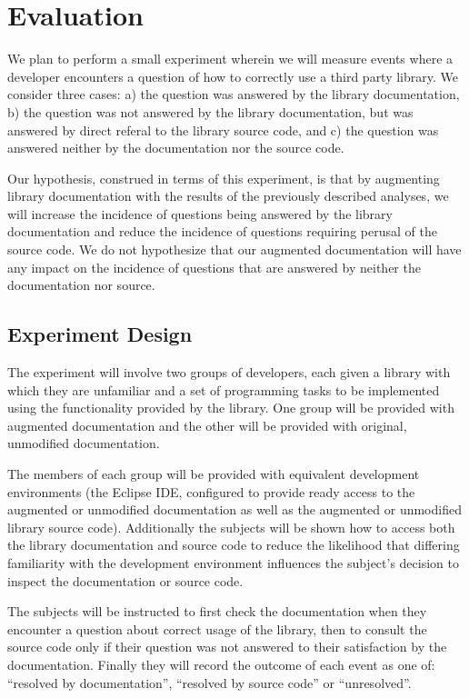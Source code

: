 \section{Evaluation}
\label{sec:Evaluation}

We plan to perform a small experiment wherein we will measure events where a
developer encounters a question of how to correctly use a third party library.
We consider three cases: a) the question was answered by the library
documentation, b) the question was not answered by the library documentation,
but was answered by direct referal to the library source code, and c) the
question was answered neither by the documentation nor the source code.

Our hypothesis, construed in terms of this experiment, is that by augmenting
library documentation with the results of the previously described analyses, we
will increase the incidence of questions being answered by the library
documentation and reduce the incidence of questions requiring perusal of the
source code. We do not hypothesize that our augmented documentation will have
any impact on the incidence of questions that are answered by neither the
documentation nor source.

\subsection{Experiment Design}
The experiment will involve two groups of developers, each given a library with
which they are unfamiliar and a set of programming tasks to be implemented
using the functionality provided by the library. One group will be provided
with augmented documentation and the other will be provided with original,
unmodified documentation.

The members of each group will be provided with equivalent development
environments (the Eclipse IDE, configured to provide ready access to the
augmented or unmodified documentation as well as the augmented or unmodified library source code).
Additionally the subjects will be shown how to access both the library
documentation and source code to reduce the likelihood that differing
familiarity with the development environment influences the subject's decision
to inspect the documentation or source code.

The subjects will be instructed to first check the documentation when they
encounter a question about correct usage of the library, then to consult the
source code only if their question was not answered to their satisfaction by
the documentation. Finally they will record the outcome of each event as one
of: ``resolved by documentation'', ``resolved by source code'' or
``unresolved''.


